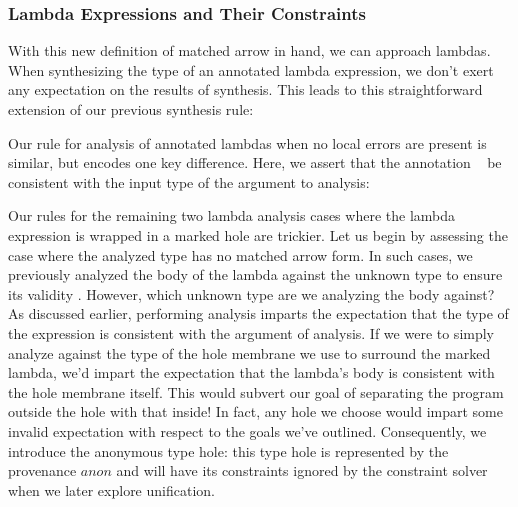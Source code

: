 \begin{mathpar}
\end{mathpar}

\subsubsection{Lambda Expressions and Their Constraints}
With this new definition of matched arrow in hand, we can approach lambdas. When synthesizing the type of an annotated lambda expression, we don't exert any expectation on the results of synthesis. This leads to this straightforward extension of our previous synthesis rule:

\begin{mathpar}
\end{mathpar}

Our rule for analysis of annotated lambdas when no local errors are present is similar, but encodes one key difference. Here, we assert that the annotation \TMV~ be consistent with the input type of the argument to analysis:

\begin{mathpar}
\end{mathpar}

Our rules for the remaining two lambda analysis cases where the lambda expression is wrapped in a marked hole are trickier. Let us begin by assessing the case where the analyzed type has no matched arrow form. In such cases, we previously analyzed the body of the lambda against the unknown type to ensure its validity . However, which unknown type are we analyzing the body against? As discussed earlier, performing analysis imparts the expectation that the type of the expression is consistent with the argument of analysis. If we were to simply analyze against the type of the hole membrane we use to surround the marked lambda, we'd impart the expectation that the lambda's body is consistent with the hole membrane itself. This would subvert our goal of separating the program outside the hole with that inside! In fact, any hole we choose would impart some invalid expectation with respect to the goals we've outlined. Consequently, we introduce the anonymous type hole: this type hole is represented by the provenance $anon$ and will have its constraints ignored by the constraint solver when we later explore unification.

